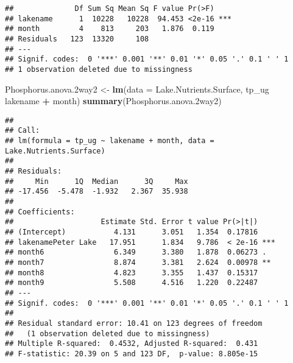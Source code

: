 \documentclass[]{article}
\newenvironment{Shaded}{\begin{snugshade}}{\end{snugshade}}
\newcommand{\CommentTok}[1]{\textcolor[rgb]{0.56,0.35,0.01}{\textit{#1}}}
\newcommand{\DataTypeTok}[1]{\textcolor[rgb]{0.13,0.29,0.53}{#1}}
\newcommand{\FloatTok}[1]{\textcolor[rgb]{0.00,0.00,0.81}{#1}}
\newcommand{\KeywordTok}[1]{\textcolor[rgb]{0.13,0.29,0.53}{\textbf{#1}}}
\newcommand{\NormalTok}[1]{#1}
\newcommand{\OperatorTok}[1]{\textcolor[rgb]{0.81,0.36,0.00}{\textbf{#1}}}
\newcommand{\StringTok}[1]{\textcolor[rgb]{0.31,0.60,0.02}{#1}}
\begin{document}
\begin{Shaded}
\end{Shaded}

\begin{verbatim}
##              Df Sum Sq Mean Sq F value Pr(>F)    
## lakename      1  10228   10228  94.453 <2e-16 ***
## month         4    813     203   1.876  0.119    
## Residuals   123  13320     108                   
## ---
## Signif. codes:  0 '***' 0.001 '**' 0.01 '*' 0.05 '.' 0.1 ' ' 1
## 1 observation deleted due to missingness
\end{verbatim}

\begin{Shaded}
\begin{Highlighting}[]
\NormalTok{Phosphorus.anova}\FloatTok{.2}\NormalTok{way2 <-}\StringTok{ }\KeywordTok{lm}\NormalTok{(}\DataTypeTok{data =}\NormalTok{ Lake.Nutrients.Surface, tp_ug }\OperatorTok{~}\StringTok{ }\NormalTok{lakename }\OperatorTok{+}\StringTok{ }\NormalTok{month)}
\KeywordTok{summary}\NormalTok{(Phosphorus.anova}\FloatTok{.2}\NormalTok{way2)}
\end{Highlighting}
\end{Shaded}

\begin{verbatim}
## 
## Call:
## lm(formula = tp_ug ~ lakename + month, data = Lake.Nutrients.Surface)
## 
## Residuals:
##     Min      1Q  Median      3Q     Max 
## -17.456  -5.478  -1.932   2.367  35.938 
## 
## Coefficients:
##                    Estimate Std. Error t value Pr(>|t|)    
## (Intercept)           4.131      3.051   1.354  0.17816    
## lakenamePeter Lake   17.951      1.834   9.786  < 2e-16 ***
## month6                6.349      3.380   1.878  0.06273 .  
## month7                8.874      3.381   2.624  0.00978 ** 
## month8                4.823      3.355   1.437  0.15317    
## month9                5.508      4.516   1.220  0.22487    
## ---
## Signif. codes:  0 '***' 0.001 '**' 0.01 '*' 0.05 '.' 0.1 ' ' 1
## 
## Residual standard error: 10.41 on 123 degrees of freedom
##   (1 observation deleted due to missingness)
## Multiple R-squared:  0.4532, Adjusted R-squared:  0.431 
## F-statistic: 20.39 on 5 and 123 DF,  p-value: 8.805e-15
\end{verbatim}
\end{document}

